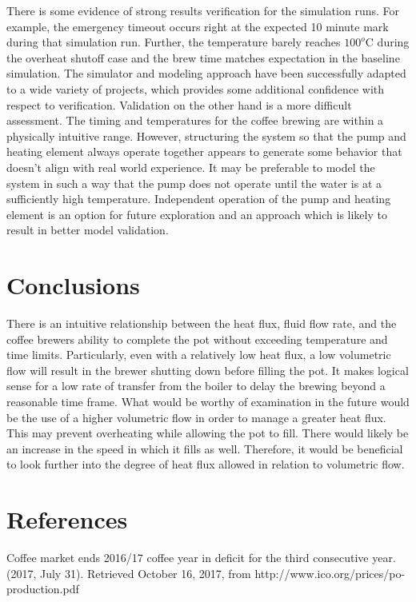 \documentclass[10pt]{article}
\newcommand{\hin}{\hangindent=8mm \hangafter=1 \noindent }
\begin{document}
There is some evidence of strong results verification for the simulation runs.  For example, the emergency timeout occurs right at the expected 10 minute mark during that simulation run.  Further, the temperature barely reaches $100^o$C during the overheat shutoff case and the brew time matches expectation in the baseline simulation.  The simulator and modeling approach have been successfully adapted to a wide variety of projects, which provides some additional confidence with respect to verification.  Validation on the other hand is a more difficult assessment.  The timing and temperatures for the coffee brewing are within a physically intuitive range.  However, structuring the system so that the pump and heating element always operate together appears to generate some behavior that doesn't align with real world experience.  It may be preferable to model the system in such a way that the pump does not operate until the water is at a sufficiently high temperature.  Independent operation of the pump and heating element is an option for future exploration and an approach which is likely to result in better model validation.


\section{Conclusions}
There is an intuitive relationship between the heat flux, fluid flow rate, and the coffee brewers ability to
complete the pot without exceeding temperature and time limits. Particularly, even with a
relatively low heat flux, a low volumetric flow will result in the brewer shutting down before filling the
pot. It makes logical sense for a low rate of transfer from the boiler to delay the brewing beyond a
reasonable time frame. What would be worthy of examination in the future would be the use of a higher
volumetric flow in order to manage a greater heat flux. This may prevent overheating while
allowing the pot to fill. There would likely be an increase in the speed in which it fills as well. Therefore, it
would be beneficial to look further into the degree of heat flux allowed in relation to volumetric flow.

\newpage
\section{References}
\doublespace
\hin Coffee market ends 2016/17 coffee year in deficit for the third consecutive year. (2017, July 31). Retrieved October 16, 2017, from http://www.ico.org/prices/po-production.pdf
\end{document}
